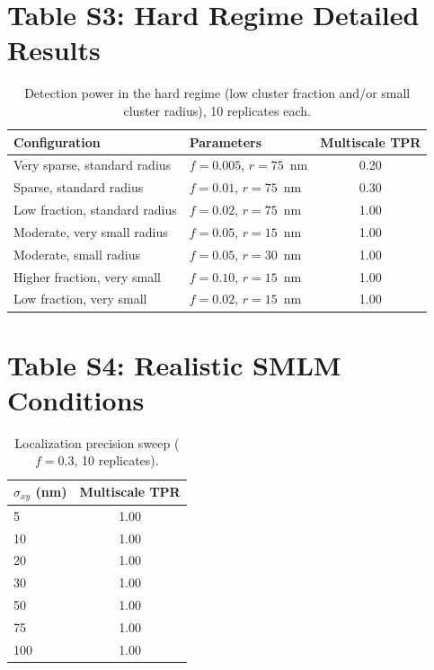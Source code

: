 \documentclass[11pt]{article}
\begin{document}
\section*{Table S3: Hard Regime Detailed Results}

\begin{table}[ht]
\centering
\caption{Detection power in the hard regime (low cluster fraction
  and/or small cluster radius), 10 replicates each.}
\label{tab:s3_hard}
\begin{tabular}{llc}
\toprule
Configuration & Parameters & Multiscale TPR \\
\midrule
Very sparse, standard radius & $f = 0.005$, $r = 75$~nm & 0.20 \\
Sparse, standard radius      & $f = 0.01$, $r = 75$~nm  & 0.30 \\
Low fraction, standard radius & $f = 0.02$, $r = 75$~nm & 1.00 \\
Moderate, very small radius   & $f = 0.05$, $r = 15$~nm & 1.00 \\
Moderate, small radius        & $f = 0.05$, $r = 30$~nm & 1.00 \\
Higher fraction, very small   & $f = 0.10$, $r = 15$~nm & 1.00 \\
Low fraction, very small      & $f = 0.02$, $r = 15$~nm & 1.00 \\
\bottomrule
\end{tabular}
\end{table}

\section*{Table S4: Realistic SMLM Conditions}

\begin{table}[ht]
\centering
\caption{Localization precision sweep ($f = 0.3$, 10 replicates).}
\label{tab:s4_precision}
\begin{tabular}{lc}
\toprule
$\sigma_{xy}$ (nm) & Multiscale TPR \\
\midrule
5   & 1.00 \\
10  & 1.00 \\
20  & 1.00 \\
30  & 1.00 \\
50  & 1.00 \\
75  & 1.00 \\
100 & 1.00 \\
\bottomrule
\end{tabular}
\end{table}
\end{document}
